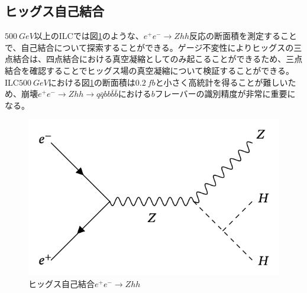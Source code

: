 \subsection{ヒッグス自己結合}
$\SI{500}{GeV}$以上のILCでは図\ref{selfcoupling}のような、$e^+e^- \rightarrow Zhh$反応の断面積を測定することで、自己結合について探索することができる。ゲージ不変性によりヒッグスの三点結合は、四点結合における真空凝縮としてのみ起こることができるため、三点結合を確認することでヒッグス場の真空凝縮について検証することができる。ILC$\SI{500}{GeV}$における図\ref{selfcoupling}の断面積は$\SI{0.2}{fb}$と小さく高統計を得ることが難しいため、崩壊$e^+e^- \rightarrow Zhh \rightarrow q\bar{q}bb\bar{b}\bar{b}$における$b$フレーバーの識別精度が非常に重要になる。
\begin{figure}[h]
	\begin{center}
 \includegraphics[keepaspectratio, scale=0.3]
 	{Figure/Introduction/selfcoupling.png}
 		\caption[ヒッグス自己結合]{ヒッグス自己結合$e^+e^- \rightarrow Zhh$}
 		\label{selfcoupling}
	\end{center}
\end{figure}
